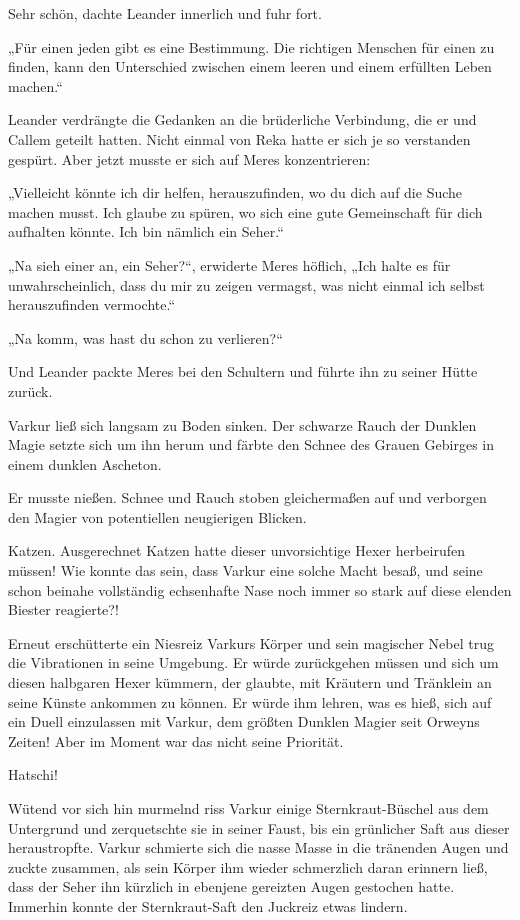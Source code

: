 \documentclass[10pt, a4paper, oneside]{book}
\begin{document}
Sehr schön, dachte Leander innerlich und fuhr fort.

„Für einen jeden gibt es eine Bestimmung. Die richtigen Menschen für einen zu finden, kann den Unterschied zwischen einem leeren und einem erfüllten Leben machen.“

Leander verdrängte die Gedanken an die brüderliche Verbindung, die er und Callem geteilt hatten. Nicht einmal von Reka hatte er sich je so verstanden gespürt. Aber jetzt musste er sich auf Meres konzentrieren:

„Vielleicht könnte ich dir helfen, herauszufinden, wo du dich auf die Suche machen musst. Ich glaube zu spüren, wo sich eine gute Gemeinschaft für dich aufhalten könnte. Ich bin nämlich ein Seher.“

„Na sieh einer an, ein Seher?“, erwiderte Meres höflich, „Ich halte es für unwahrscheinlich, dass du mir zu zeigen vermagst, was nicht einmal ich selbst herauszufinden vermochte.“

„Na komm, was hast du schon zu verlieren?“

Und Leander packte Meres bei den Schultern und führte ihn zu seiner Hütte zurück.\bigskip







Varkur ließ sich langsam zu Boden sinken. Der schwarze Rauch der Dunklen Magie setzte sich um ihn herum und färbte den Schnee des Grauen Gebirges in einem dunklen Ascheton.

Er musste nießen. Schnee und Rauch stoben gleichermaßen auf und verborgen den Magier von potentiellen neugierigen Blicken.

Katzen. Ausgerechnet Katzen hatte dieser unvorsichtige Hexer herbeirufen müssen! Wie konnte das sein, dass Varkur eine solche Macht besaß, und seine schon beinahe vollständig echsenhafte Nase noch immer so stark auf diese elenden Biester reagierte?!

Erneut erschütterte ein Niesreiz Varkurs Körper und sein magischer Nebel trug die Vibrationen in seine Umgebung. Er würde zurückgehen müssen und sich um diesen halbgaren Hexer kümmern, der glaubte, mit Kräutern und Tränklein an seine Künste ankommen zu können. Er würde ihm lehren, was es hieß, sich auf ein Duell einzulassen mit Varkur, dem größten Dunklen Magier seit Orweyns Zeiten! Aber im Moment war das nicht seine Priorität.

Hatschi!

Wütend vor sich hin murmelnd riss Varkur einige Sternkraut-Büschel aus dem Untergrund und zerquetschte sie in seiner Faust, bis ein grünlicher Saft aus dieser heraustropfte. Varkur schmierte sich die nasse Masse in die tränenden Augen und zuckte zusammen, als sein Körper ihm wieder schmerzlich daran erinnern ließ, dass der Seher ihn kürzlich in ebenjene gereizten Augen gestochen hatte. Immerhin konnte der Sternkraut-Saft den Juckreiz etwas lindern.
\end{document}
